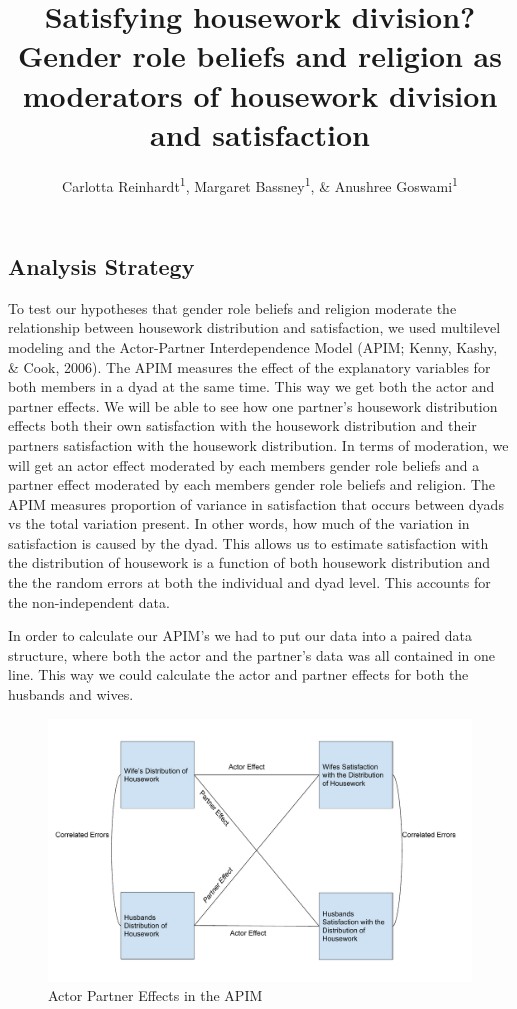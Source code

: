 \documentclass[
  english,
  man,floatsintext]{apa6}
\title{Satisfying housework division? Gender role beliefs and religion as moderators of housework division and satisfaction}
\author{Carlotta Reinhardt\textsuperscript{1}, Margaret Bassney\textsuperscript{1}, \& Anushree Goswami\textsuperscript{1}}
\date{}
\affiliation{\vspace{0.5cm}\textsuperscript{1} Smith College}
\begin{document}
\maketitle

\hypertarget{analysis-strategy}{%
\subsection{Analysis Strategy}\label{analysis-strategy}}

To test our hypotheses that gender role beliefs and religion moderate the relationship between housework distribution and satisfaction, we used multilevel modeling and the Actor-Partner Interdependence Model (APIM; Kenny, Kashy, \& Cook, 2006). The APIM measures the effect of the explanatory variables for both members in a dyad at the same time. This way we get both the actor and partner effects. We will be able to see how one partner's housework distribution effects both their own satisfaction with the housework distribution and their partners satisfaction with the housework distribution. In terms of moderation, we will get an actor effect moderated by each members gender role beliefs and a partner effect moderated by each members gender role beliefs and religion. The APIM measures proportion of variance in satisfaction that occurs between dyads vs the total variation present. In other words, how much of the variation in satisfaction is caused by the dyad. This allows us to estimate satisfaction with the distribution of housework is a function of both housework distribution and the the random errors at both the individual and dyad level. This accounts for the non-independent data.

In order to calculate our APIM's we had to put our data into a paired data structure, where both the actor and the partner's data was all contained in one line. This way we could calculate the actor and partner effects for both the husbands and wives.


\begin{figure}
\centering
\includegraphics{APIM_Housework_Distribution.pdf}
\caption{\label{fig:my-figure}Actor Partner Effects in the APIM}
\end{figure}
\end{document}
